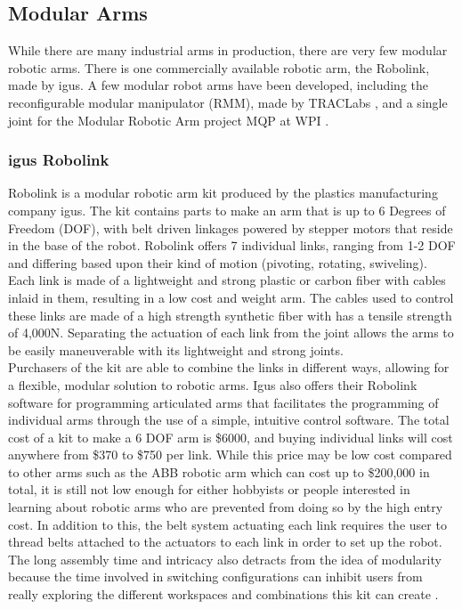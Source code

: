 \subsection{Modular Arms}
While there are many industrial arms in production, there are very few modular robotic arms. There is one commercially available robotic arm, the Robolink, made by igus. A few modular robot arms have been developed, including the reconfigurable modular manipulator (RMM), made by TRACLabs \cite{RMM}, and a single joint for the Modular Robotic Arm project MQP at WPI \cite{MRA}.

\subsubsection{igus Robolink} 
Robolink is a modular robotic arm kit produced by the plastics manufacturing company igus.  The kit contains parts to make an arm that is up to 6 Degrees of Freedom (DOF), with belt driven linkages powered by stepper motors that reside in the base of the robot.  Robolink offers 7 individual links, ranging from 1-2 DOF and differing based upon their kind of motion (pivoting, rotating, swiveling).  Each link is made of a lightweight and strong plastic or carbon fiber with cables inlaid in them, resulting in a low cost and weight arm.  The cables used to control these links are made of a high strength synthetic fiber with has a tensile strength of 4,000N.  Separating the actuation of each link from the joint allows the arms to be easily maneuverable with its lightweight and strong joints.  \\
\newline
Purchasers of the kit are able to combine the links in different ways, allowing for a flexible, modular solution to robotic arms. Igus also offers their Robolink software for programming articulated arms that facilitates the programming of individual arms through the use of a simple, intuitive control software. The total cost of a kit to make a 6 DOF arm is \$6000, and buying individual links will cost anywhere from \$370 to \$750 per link. While this price may be low cost compared to other arms such as the ABB robotic arm which can cost up to \$200,000 in total, it is still not low enough for either hobbyists or people interested in learning about robotic arms who are prevented from doing so by the high entry cost. In addition to this, the belt system actuating each link requires the user to thread belts attached to the actuators to each link in order to set up the robot. The long assembly time and intricacy also detracts from the idea of modularity because the time involved in switching configurations can inhibit users from really exploring the different workspaces and combinations this kit can create \cite{igus}.  

